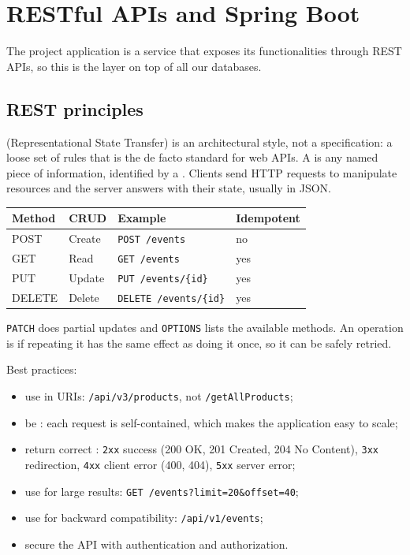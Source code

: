 \section{RESTful APIs and Spring Boot}\label{sec:rest}

The project application is a service that exposes its functionalities through REST APIs, so this is the layer on top of all our databases.

\subsection{REST principles}
 (Representational State Transfer) is an architectural style, not a specification: a loose set of rules that is the de facto standard for web APIs. A  is any named piece of information, identified by a . Clients send HTTP requests to manipulate resources and the server answers with their state, usually in JSON.

\begin{center}\small
\begin{tabular}{llll}
\toprule
\textbf{Method} & \textbf{CRUD} & \textbf{Example} & \textbf{Idempotent} \\
\midrule
POST & Create & \texttt{POST /events} & no \\
GET & Read & \texttt{GET /events} & yes \\
PUT & Update & \texttt{PUT /events/\{id\}} & yes \\
DELETE & Delete & \texttt{DELETE /events/\{id\}} & yes \\
\bottomrule
\end{tabular}
\end{center}
\texttt{PATCH} does partial updates and \texttt{OPTIONS} lists the available methods. An operation is  if repeating it has the same effect as doing it once, so it can be safely retried.

Best practices:
\begin{itemize}
  \item use  in URIs: \texttt{/api/v3/products}, not \texttt{/getAllProducts};
  \item be : each request is self-contained, which makes the application easy to scale;
  \item return correct : \texttt{2xx} success (200 OK, 201 Created, 204 No Content), \texttt{3xx} redirection, \texttt{4xx} client error (400, 404), \texttt{5xx} server error;
  \item use  for large results: \texttt{GET /events?limit=20\&offset=40};
  \item use  for backward compatibility: \texttt{/api/v1/events};
  \item secure the API with authentication and authorization.
\end{itemize}

